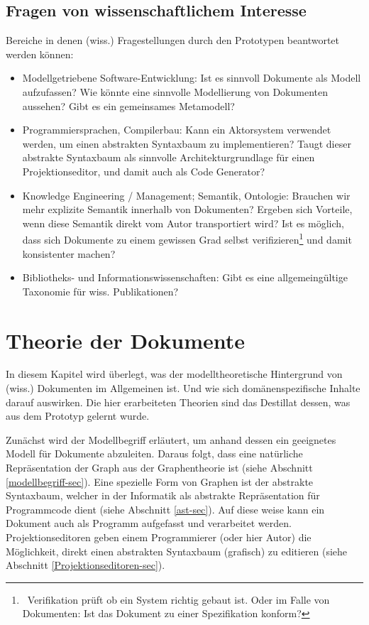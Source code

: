 \section{Fragen von wissenschaftlichem Interesse}\label{wiss-fragen}
 
Bereiche in denen (wiss.) Fragestellungen durch den Prototypen beantwortet werden können:

 
\begin{itemize}

\item
Modellgetriebene Software-Entwicklung: Ist es sinnvoll Dokumente als Modell aufzufassen? Wie könnte eine sinnvolle Modellierung von Dokumenten aussehen? Gibt es ein gemeinsames Metamodell?


\item
Programmiersprachen, Compilerbau: Kann ein Aktorsystem verwendet werden, um einen abstrakten Syntaxbaum zu implementieren? Taugt dieser abstrakte Syntaxbaum als sinnvolle Architekturgrundlage für einen Projektionseditor, und damit auch als Code Generator?


\item
Knowledge Engineering / Management; Semantik, Ontologie: Brauchen wir mehr explizite Semantik innerhalb von Dokumenten? Ergeben sich Vorteile, wenn diese Semantik direkt vom Autor transportiert wird? Ist es möglich, dass sich Dokumente zu einem gewissen Grad selbst verifizieren\footnote{~Verifikation prüft ob ein System richtig gebaut ist. Oder im Falle von Dokumenten: Ist das Dokument zu einer Spezifikation konform?} und damit konsistenter machen?


\item
Bibliotheks- und Informationswissenschaften: Gibt es eine allgemeingültige Taxonomie für wiss. Publikationen?


\end{itemize}
 
\chapter{Theorie der Dokumente}\label{}
 
In diesem Kapitel wird überlegt, was der modelltheoretische Hintergrund von (wiss.) Dokumenten im Allgemeinen ist. Und wie sich domänenspezifische Inhalte darauf auswirken. Die hier erarbeiteten Theorien sind das Destillat dessen, was aus dem Prototyp gelernt wurde.

 
Zunächst wird der Modellbegriff erläutert, um anhand dessen ein geeignetes Modell für Dokumente abzuleiten. Daraus folgt, dass eine natürliche Repräsentation der Graph aus der Graphentheorie ist (siehe Abschnitt \ref{modellbegriff-sec}). Eine spezielle Form von Graphen ist der abstrakte Syntaxbaum, welcher in der Informatik als abstrakte Repräsentation für Programmcode dient (siehe Abschnitt \ref{ast-sec}). Auf diese weise kann ein Dokument auch als Programm aufgefasst und verarbeitet werden. Projektionseditoren geben einem Programmierer (oder hier Autor) die Möglichkeit, direkt einen abstrakten Syntaxbaum (grafisch) zu editieren (siehe Abschnitt \ref{Projektionseditoren-sec}).

